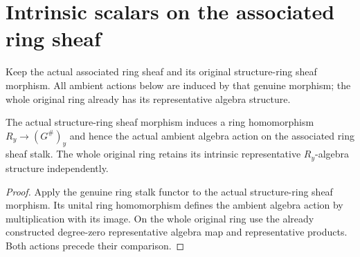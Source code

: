 \section{Intrinsic scalars on the associated ring sheaf}

Keep the actual associated ring sheaf and its original structure-ring
sheaf morphism. All ambient actions below are induced by that genuine
morphism; the whole original ring already has its representative algebra
structure.

\begin{definition}
\label{hir:real-domain-actual-normal-associated-ring-sheaf-ambient-scalars}
\leanok
The actual structure-ring sheaf morphism induces a ring homomorphism
$R_y\to(G^{\#})_y$ and hence the actual ambient algebra action on the
associated ring sheaf stalk. The whole original ring retains its
intrinsic representative $R_y$-algebra structure independently.
\end{definition}
\begin{proof}
Apply the genuine ring stalk functor to the actual structure-ring sheaf
morphism. Its unital ring homomorphism defines the ambient algebra
action by multiplication with its image. On the whole original ring use
the already constructed degree-zero representative algebra map and
representative products. Both actions precede their comparison.
\end{proof}

